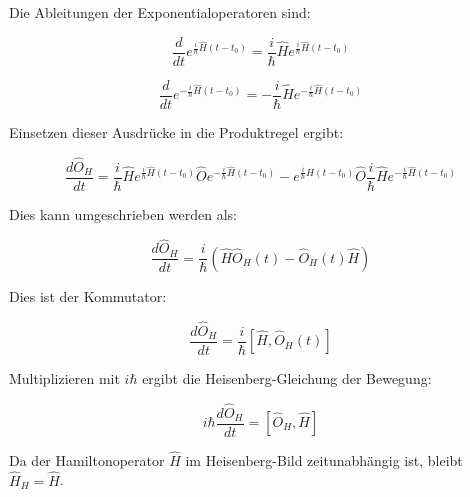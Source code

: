 \documentclass[11pt,a4paper]{article}
\begin{document}
Die Ableitungen der Exponentialoperatoren sind:

\[
\frac{d}{d t} e^{\frac{i}{\hbar} \hat{H}(t-t_0)} = \frac{i}{\hbar} \hat{H} e^{\frac{i}{\hbar} \hat{H}(t-t_0)}
\]

\[
\frac{d}{d t} e^{-\frac{i}{\hbar} \hat{H}(t-t_0)} = -\frac{i}{\hbar} \hat{H} e^{-\frac{i}{\hbar} \hat{H}(t-t_0)}
\]

Einsetzen dieser Ausdrücke in die Produktregel ergibt:

\[
\frac{d \hat{O}_H}{d t} = \frac{i}{\hbar} \hat{H} e^{\frac{i}{\hbar} \hat{H}(t-t_0)} \hat{O} e^{-\frac{i}{\hbar} \hat{H}(t-t_0)} - e^{\frac{i}{\hbar} \hat{H}(t-t_0)} \hat{O} \frac{i}{\hbar} \hat{H} e^{-\frac{i}{\hbar} \hat{H}(t-t_0)}
\]

Dies kann umgeschrieben werden als:

\[
\frac{d \hat{O}_H}{d t} = \frac{i}{\hbar} \left( \hat{H} \hat{O}_H(t) - \hat{O}_H(t) \hat{H} \right)
\]

Dies ist der Kommutator:

\[
\frac{d \hat{O}_H}{d t} = \frac{i}{\hbar} [\hat{H}, \hat{O}_H(t)]
\]

Multiplizieren mit \(i \hbar\) ergibt die Heisenberg-Gleichung der Bewegung:

\[
i \hbar \frac{d \hat{O}_H}{d t} = [\hat{O}_H, \hat{H}]
\]

Da der Hamiltonoperator \(\hat{H}\) im Heisenberg-Bild zeitunabhängig ist, bleibt \(\hat{H}_H = \hat{H}\).
\end{document}
